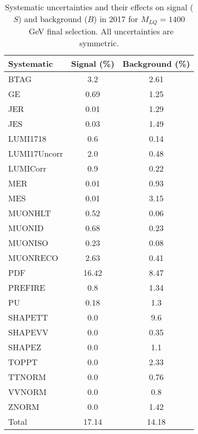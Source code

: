 \begin{table}[htbp]
\begin{center}
\caption{Systematic uncertainties and their effects on signal ($S$) and background ($B$) in 2017 for $M_{LQ}=1400$~GeV final selection. All uncertainties are symmetric.}
\begin{tabular}{lcc}
\hline\hline
Systematic & Signal (\%) & Background (\%) \\ \hline 
BTAG & 3.2 & 2.61\\ 
GE & 0.69 & 1.25\\ 
JER & 0.01 & 1.29\\ 
JES & 0.03 & 1.49\\ 
LUMI1718 & 0.6 & 0.14\\ 
LUMI17Uncorr & 2.0 & 0.48\\ 
LUMICorr & 0.9 & 0.22\\ 
MER & 0.01 & 0.93\\ 
MES & 0.01 & 3.15\\ 
MUONHLT & 0.52 & 0.06\\ 
MUONID & 0.68 & 0.23\\ 
MUONISO & 0.23 & 0.08\\ 
MUONRECO & 2.63 & 0.41\\ 
PDF & 16.42 & 8.47\\ 
PREFIRE & 0.8 & 1.34\\ 
PU & 0.18 & 1.3\\ 
SHAPETT & 0.0 & 9.6\\ 
SHAPEVV & 0.0 & 0.35\\ 
SHAPEZ & 0.0 & 1.1\\ 
TOPPT & 0.0 & 2.33\\ 
TTNORM & 0.0 & 0.76\\ 
VVNORM & 0.0 & 0.8\\ 
ZNORM & 0.0 & 1.42\\ 
Total & 17.14 & 14.18\\ \hline \hline
\end{tabular}
\label{tab:SysUncertainties_uujj_1400}
\end{center}
\end{table}

